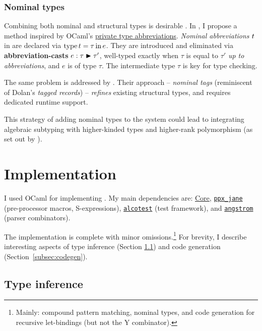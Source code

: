 \subsubsection{Nominal types} 
Combining both nominal and structural types is desirable \cite{mlstruct, integrating-nominal-and-structural}. In \fabric{}, I propose a method inspired by OCaml's \href{https://ocaml.org/manual/5.1/privatetypes.html#ss:private-types-abbrev}{private type abbreviations}.
\emph{Nominal abbreviations} $t$ in \fabric{} are declared via $\mathrm{type}\,t=\tau\,\mathrm{in}\,e$. They are introduced and eliminated via \textbf{abbreviation-casts} ${e} : {\tau} \blacktriangleright {\tau'}$, well-typed exactly when $\tau$ is equal to $\tau'$ \emph{up to abbreviations}, and $e$ is of type $\tau$. The intermediate type $\tau$ is key for type checking.

The same problem is addressed by \textcite{mlstruct}. Their approach -- \emph{nominal tags} (reminiscent of Dolan's \emph{tagged records}) -- \emph{refines} existing structural types, and requires dedicated runtime support.

This strategy of adding nominal types to the system could lead to integrating algebraic subtyping with higher-kinded types and higher-rank polymorphism (as set out by \textcite[Section~11.1]{dolan-thesis}). 

\section{Implementation}
\label{sec:fabric-impl}

I used OCaml for implementing \compiler{}. My main dependencies are: \href{https://opensource.janestreet.com/core/}{Core}, \href{https://github.com/janestreet/ppx_jane}{\texttt{ppx\_jane}} (pre-processor macros, S-expressions), \href{https://github.com/mirage/alcotest}{\texttt{alcotest}} (test framework), and \href{https://github.com/inhabitedtype/angstrom}{\texttt{angstrom}} (parser combinators).

The implementation is complete with minor omissions.\footnote{Mainly: compound pattern matching, nominal types, and code generation for recursive let-bindings (but not the Y combinator).} For brevity, I describe interesting aspects of type inference (Section \ref{subsec:type-inference-impl}) and code generation (Section~\ref{subsec:codegen}).

\subsection{Type inference} 
\label{subsec:type-inference-impl}

